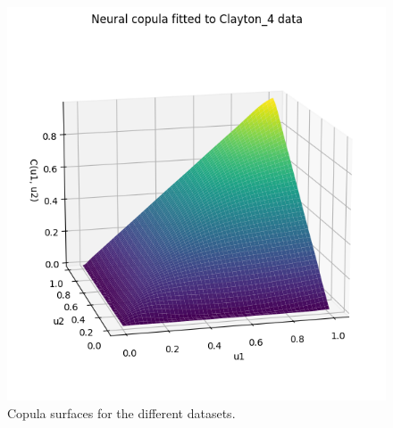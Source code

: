 \documentclass[%
a4paper,							
11pt,								
bibliography=totoc,						
abstracton=true					
]
{scrartcl}
\theoremstyle{plain}
\theoremstyle{definition}
\theoremstyle{remark}
\newcommand{\1}{\mathbbm{1}}
\begin{document}
\begin{figure}[H]
\begin{minipage}{0.45\textwidth}
    \end{minipage}
    \hfill
    \begin{minipage}{0.45\textwidth}
        \centering
        \includegraphics[width=\textwidth]{5ResultsDiscussion/pictures/PortfolioTest/CopulaSurface4.png}
    \end{minipage}

    \caption{Copula surfaces for the different datasets.}
    \label{fig:NeuralCopulaSurface}
\end{figure}



\newpage
\end{document}
